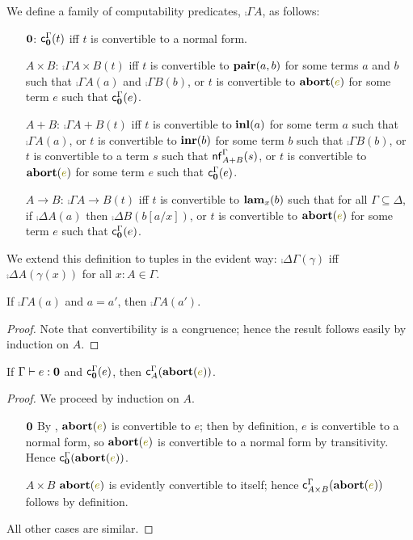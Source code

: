 \documentclass[a4paper]{article}
\begin{document}
\begin{definition}
  We define a family of computability predicates, $\comp{\Gamma}{A}$, as follows:
  \begin{itemize}
  \item[$\mathbf{0}$:] $\operatorname{\mathsf{c}}^{\Gamma}_{\mathbf{0}}(t)$ iff $t$ is convertible to a normal form.
  \item[$A \times B$:] $\comp{\Gamma}{A \times B}(t)$ iff $t$ is convertible to $\operatorname{\mathbf{pair}}(a,b)$ for some terms $a$ and $b$ such that $\comp{\Gamma}{A}(a)$ and $\comp{\Gamma}{B}(b)$, or $t$ is convertible to $\tmAbort{e}$ for some term $e$ such that $\operatorname{\mathsf{c}}^{\Gamma}_{\mathbf{0}}(e)$.
  \item[$A + B$:] $\comp{\Gamma}{A + B}(t)$ iff $t$ is convertible to $\operatorname{\mathbf{inl}}(a)$ for some term $a$ such that $\comp{\Gamma}{A}(a)$, or $t$ is convertible to $\operatorname{\mathbf{inr}}(b)$ for some term $b$ such that $\comp{\Gamma}{B}(b)$, or $t$ is convertible to a term $s$ such that $\operatorname{\mathsf{nf}}^{\Gamma}_{A + B}(s)$, or $t$ is convertible to $\tmAbort{e}$ for some term $e$ such that $\operatorname{\mathsf{c}}^{\Gamma}_{\mathbf{0}}(e)$.
  \item[$A \to B$:] $\comp{\Gamma}{A \to B}(t)$ iff $t$ is convertible to $\operatorname{\mathbf{lam}}_{x}(b)$ such that for all $\Gamma \subseteq \Delta$, if $\comp{\Delta}{A}(a)$ then $\comp{\Delta}{B}(b[a/x])$, or $t$ is convertible to $\tmAbort{e}$ for some term $e$ such that $\operatorname{\mathsf{c}}^{\Gamma}_{\mathbf{0}}(e)$.
  \end{itemize}
  We extend this definition to tuples in the evident way: $\comp{\Delta}{\Gamma}(\gamma)$ iff $\comp{\Delta}{A}(\gamma(x))$ for all $x : A \in \Gamma$.
\end{definition}

\begin{lemma}\label{thm:0002}
  If $\comp{\Gamma}{A}(a)$ and $a = a'$, then $\comp{\Gamma}{A}(a')$.
\end{lemma}
\begin{proof}
  Note that convertibility is a congruence; hence the result follows easily by induction on $A$.
\end{proof}

\begin{lemma}\label{thm:0000}
  If $\Gamma \vdash e : \mathbf{0}$ and $\operatorname{\mathsf{c}}^{\Gamma}_{\mathbf{0}}(e)$, then $\comp{\Gamma}{A}(\tmAbort{e})$.
\end{lemma}
\begin{proof}
  We proceed by induction on $A$.
  \begin{itemize}
  \item[$\mathbf{0}$] By \rEmpe, $\tmAbort{e}$ is convertible to $e$; then by definition, $e$ is convertible to a normal form, so $\tmAbort{e}$ is convertible to a normal form by transitivity.
    Hence $\comp{\Gamma}{\tpEmp}(\tmAbort{e})$.
  \item[$A \times B$] $\tmAbort{e}$ is evidently convertible to itself; hence $\comp{\Gamma}{A \times B}(\tmAbort{e})$ follows by definition.
  \end{itemize}
  All other cases are similar.
\end{proof}
\end{document}
